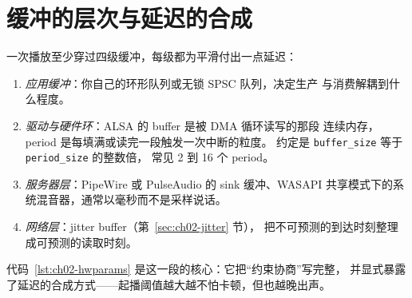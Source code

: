 \documentclass[12pt,a4paper,fontset=fandol]{ctexbook}
\newcommand{\Tp}[1]{\texttt{#1}}
\begin{document}
\section{缓冲的层次与延迟的合成}
\label{sec:ch02-buffer-layers}

一次播放至少穿过四级缓冲，每级都为平滑付出一点延迟：

\begin{enumerate}
  \item \emph{应用缓冲}：你自己的环形队列或无锁 SPSC 队列，决定生产
        与消费解耦到什么程度。
  \item \emph{驱动与硬件环}：ALSA 的 buffer 是被 DMA 循环读写的那段
        连续内存，period 是每填满或读完一段触发一次中断的粒度。
        约定是 \Tp{buffer\_size} 等于 \Tp{period\_size} 的整数倍，
        常见 2 到 16 个 period。
  \item \emph{服务器层}：PipeWire 或 PulseAudio 的 sink 缓冲、WASAPI
        共享模式下的系统混音器，通常以毫秒而不是采样说话。
  \item \emph{网络层}：jitter buffer（第~\ref{sec:ch02-jitter} 节），
        把不可预测的到达时刻整理成可预测的读取时刻。
\end{enumerate}

代码~\ref{lst:ch02-hwparams} 是这一段的核心：它把``约束协商''写完整，
并显式暴露了延迟的合成方式——起播阈值越大越不怕卡顿，但也越晚出声。
\end{document}
